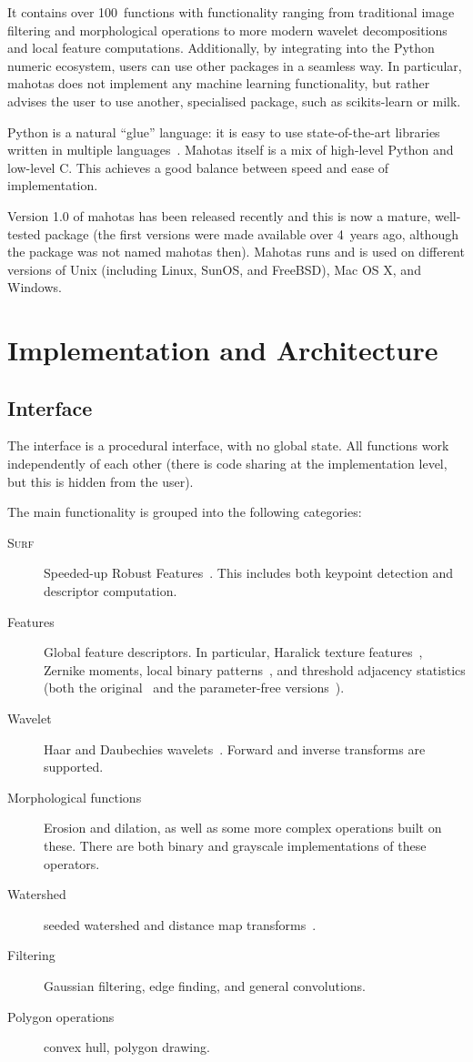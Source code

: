\documentclass{scrartcl}
\newcommand*{\cpp}{{C\nolinebreak[4]\hspace{-.05em}\raisebox{.4ex}{\tiny\textbf{++}}}}
\begin{document}
It contains over 100~functions with functionality ranging from traditional
image filtering and morphological operations to more modern wavelet
decompositions and local feature computations. Additionally, by integrating
into the Python numeric ecosystem, users can use other packages in a seamless
way. In particular, mahotas does not implement any machine learning
functionality, but rather advises the user to use another, specialised package,
such as scikits-learn or milk.

Python is a natural ``glue'' language: it is easy to use state-of-the-art
libraries written in multiple languages~\citep{10.1109/MCSE.2007.58}. Mahotas
itself is a mix of high-level Python and low-level \cpp{}. This achieves a good
balance between speed and ease of implementation.

Version 1.0 of mahotas has been released recently and this is now a mature,
well-tested package (the first versions were made available over 4~years ago,
although the package was not named mahotas then). Mahotas runs and is used on
different versions of Unix (including Linux, SunOS, and FreeBSD), Mac OS X, and
Windows.

\section{Implementation and Architecture}

\subsection{Interface}

The interface is a procedural interface, with no global state. All functions
work independently of each other (there is code sharing at the implementation
level, but this is hidden from the user).

The main functionality is grouped into the following categories:

\begin{description}
\item[\textsc{Surf}] Speeded-up Robust Features~\citep{eth_biwi_00517}. This
includes both keypoint detection and descriptor computation.
\item[Features] Global feature descriptors. In particular, Haralick texture
features~\citep{Haralick1973}, Zernike moments, local binary
patterns~\citep{Ojala2002}, and threshold adjacency statistics (both the
original~\citep{Hamilton2007} and the parameter-free
versions~\citep{Coelho2010}).
\item[Wavelet] Haar and Daubechies wavelets~\citep{Daubechies90}. Forward and
inverse transforms are supported.
\item[Morphological functions] Erosion and dilation, as well as some more
complex operations built on these. There are both binary and grayscale
implementations of these operators.
\item[Watershed] seeded watershed and distance map
transforms~\citep{felzenszwalb}.
\item[Filtering] Gaussian filtering, edge finding, and general convolutions.
\item[Polygon operations] convex hull, polygon drawing.
\end{description}
\end{document}
